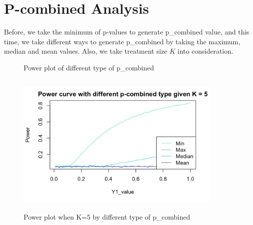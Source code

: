 \documentclass[10pt,english]{article}\usepackage{graphicx, color}
\numberwithin{equation}{section}
\numberwithin{figure}{section}
\begin{document}
\section{P-combined Analysis}
Before, we take the minimum of p-values to generate p\_combined value, and this time, we take different ways to generate p\_combined by taking the maximum, median and mean values. Also, we take treatment size $K$ into consideration.
\begin{figure}[htbp]
\centering{}
\caption{Power plot of different type of p\_combined}
\end{figure}
\begin{figure}[htbp]
\centering\includegraphics[width=10cm,height=7cm]{5}
\caption{Power plot when K=5 by different type of p\_combined}
\end{figure}
\end{document}
